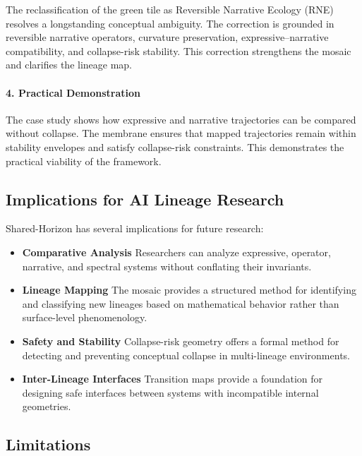 The reclassification of the green tile as Reversible Narrative Ecology (RNE)
resolves a longstanding conceptual ambiguity. The correction is grounded in
reversible narrative operators, curvature preservation, expressive–narrative
compatibility, and collapse-risk stability. This correction strengthens the
mosaic and clarifies the lineage map.

\paragraph{4. Practical Demonstration}

The case study shows how expressive and narrative trajectories can be compared
without collapse. The membrane ensures that mapped trajectories remain within
stability envelopes and satisfy collapse-risk constraints. This demonstrates the
practical viability of the framework.

\subsection{Implications for AI Lineage Research}

Shared-Horizon has several implications for future research:

\begin{itemize}
    \item \textbf{Comparative Analysis}  
    Researchers can analyze expressive, operator, narrative, and spectral
    systems without conflating their invariants.

    \item \textbf{Lineage Mapping}  
    The mosaic provides a structured method for identifying and classifying new
    lineages based on mathematical behavior rather than surface-level
    phenomenology.

    \item \textbf{Safety and Stability}  
    Collapse-risk geometry offers a formal method for detecting and preventing
    conceptual collapse in multi-lineage environments.

    \item \textbf{Inter-Lineage Interfaces}  
    Transition maps provide a foundation for designing safe interfaces between
    systems with incompatible internal geometries.
\end{itemize}

\subsection{Limitations}

